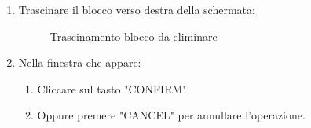 \begin{enumerate}
	\newpage
	\item Trascinare il blocco verso destra della schermata;
	\begin{figure}[!ht]
		\centering
		\caption{Trascinamento blocco da eliminare}
	\end{figure}
	\newpage
	\item Nella finestra che appare:
	\begin{enumerate}
		\item Cliccare sul tasto "CONFIRM".
		\item Oppure premere "CANCEL" per annullare l'operazione.
	\end{enumerate}
	\begin{figure}[!ht]

\end{figure}
\end{enumerate}
